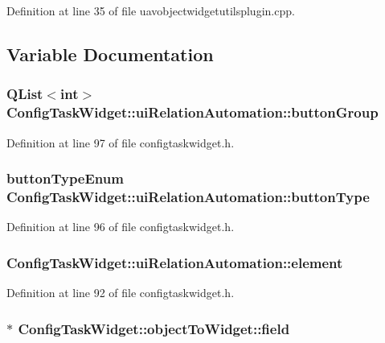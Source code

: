 \-Definition at line 35 of file uavobjectwidgetutilsplugin.\-cpp.



\subsection{\-Variable \-Documentation}
\hypertarget{group___u_a_v_object_widget_utils_ga915cb6bdf9aff1b607f8917b6f665fbd}{
\subsubsection[{button\-Group}]{\setlength{\rightskip}{0pt plus 5cm}\-Q\-List$<$int$>$ {\bf \-Config\-Task\-Widget\-::ui\-Relation\-Automation\-::button\-Group}}}\label{group___u_a_v_object_widget_utils_ga915cb6bdf9aff1b607f8917b6f665fbd}


\-Definition at line 97 of file configtaskwidget.\-h.

\hypertarget{group___u_a_v_object_widget_utils_gac8fcf738efe2855fbf1c7a810a20cffd}{
\subsubsection[{button\-Type}]{\setlength{\rightskip}{0pt plus 5cm}button\-Type\-Enum {\bf \-Config\-Task\-Widget\-::ui\-Relation\-Automation\-::button\-Type}}}\label{group___u_a_v_object_widget_utils_gac8fcf738efe2855fbf1c7a810a20cffd}


\-Definition at line 96 of file configtaskwidget.\-h.

\hypertarget{group___u_a_v_object_widget_utils_gabe7df1fc4c590dc11cc6f80698fc125c}{
\subsubsection[{element}]{ {\bf \-Config\-Task\-Widget\-::ui\-Relation\-Automation\-::element}}}\label{group___u_a_v_object_widget_utils_gabe7df1fc4c590dc11cc6f80698fc125c}


\-Definition at line 92 of file configtaskwidget.\-h.

\hypertarget{group___u_a_v_object_widget_utils_ga36fdb22e759e0beae23ae99b03becb68}{
\subsubsection[{field}]{$\ast$ {\bf \-Config\-Task\-Widget\-::object\-To\-Widget\-::field}}}\label{group___u_a_v_object_widget_utils_ga36fdb22e759e0beae23ae99b03becb68}


